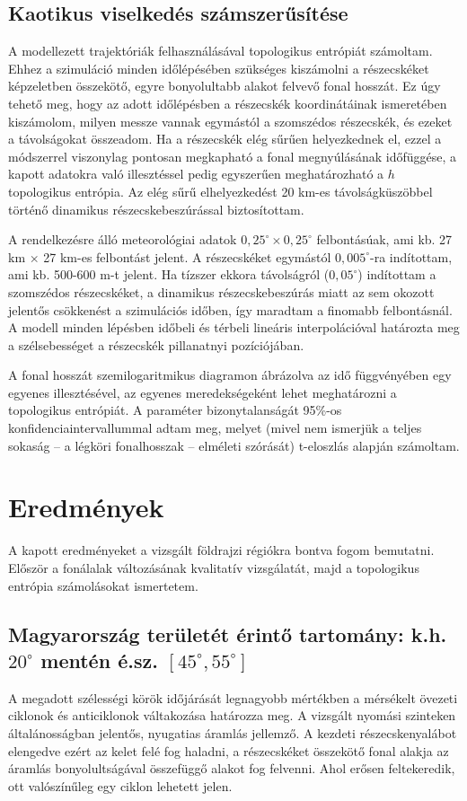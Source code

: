\documentclass[12pt,a4paper]{article}
\begin{document}
\subsection{Kaotikus viselkedés számszerűsítése}
A modellezett trajektóriák felhasználásával topologikus entrópiát számoltam. Ehhez a szimuláció minden időlépésében szükséges kiszámolni a részecskéket képzeletben összekötő, egyre bonyolultabb alakot felvevő fonal hosszát. Ez úgy tehető meg, hogy az adott időlépésben a részecskék koordinátáinak ismeretében kiszámolom, milyen messze vannak egymástól a szomszédos részecskék, és ezeket a távolságokat összeadom. Ha a részecskék elég sűrűen helyezkednek el, ezzel a módszerrel viszonylag pontosan megkapható a fonal megnyúlásának időfüggése, a kapott adatokra való illesztéssel pedig egyszerűen meghatározható a $h$ topologikus entrópia. Az elég sűrű elhelyezkedést 20 km-es távolságküszöbbel történő dinamikus részecskebeszúrással biztosítottam.

A rendelkezésre álló meteorológiai adatok $0,25^\circ \times 0,25^\circ$ felbontásúak, ami kb. 27 km $\times$ 27 km-es felbontást jelent. A részecskéket egymástól $0,005 ^\circ$-ra indítottam, ami kb. 500-600 m-t jelent. Ha tízszer ekkora távolságról ($0,05^\circ$) indítottam a szomszédos részecskéket, a dinamikus részecskebeszúrás miatt az sem okozott jelentős csökkenést a szimulációs időben, így maradtam a finomabb felbontásnál. A modell minden lépésben időbeli és térbeli lineáris interpolációval határozta meg a szélsebességet a részecskék pillanatnyi pozíciójában.

A fonal hosszát szemilogaritmikus diagramon ábrázolva az idő függvényében egy egyenes illesztésével, az egyenes meredekségeként lehet meghatározni a topologikus entrópiát. A paraméter bizonytalanságát 95\%-os konfidenciaintervallummal adtam meg, melyet (mivel nem ismerjük a teljes sokaság -- a légköri fonalhosszak -- elméleti szórását) t-eloszlás alapján számoltam.

\section{Eredmények}
A kapott eredményeket a vizsgált földrajzi régiókra bontva fogom bemutatni. Először a fonálalak változásának kvalitatív vizsgálatát, majd a topologikus entrópia számolásokat ismertetem.

\subsection{Magyarország területét érintő tartomány: k.h. $20^\circ$ mentén é.sz. $[45^\circ, 55^\circ]$}
A megadott szélességi körök időjárását legnagyobb mértékben a mérsékelt övezeti ciklonok és anticiklonok váltakozása határozza meg. A vizsgált nyomási szinteken általánosságban jelentős, nyugatias áramlás jellemző. A kezdeti részecskenyalábot elengedve ezért az kelet felé fog haladni, a részecskéket összekötő fonal alakja az áramlás bonyolultságával összefüggő alakot fog felvenni. Ahol erősen feltekeredik, ott valószínűleg egy ciklon lehetett jelen.
\end{document}
